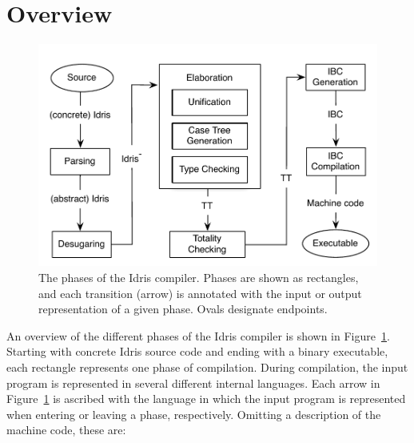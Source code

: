 \section{Overview}
\begin{figure}
\includegraphics[scale=0.9]{figures/Idris-overview}
\caption{The phases of the Idris compiler. Phases are shown as rectangles, and
  each transition (arrow) is annotated with the input or output representation
  of a given phase. Ovals designate endpoints.}
\label{fig:idris-overview}
\end{figure}
An overview of the different phases of the Idris compiler is shown in
Figure~\ref{fig:idris-overview}. Starting with concrete Idris source code and
ending with a binary executable, each rectangle represents one phase of
compilation. During compilation, the input program is represented in several
different internal languages. Each arrow in Figure~\ref{fig:idris-overview}
is ascribed with the language in which the input program is represented when entering
or leaving a phase, respectively. Omitting a description of the machine code, these are:
